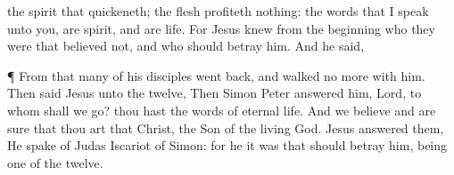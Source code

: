 {{{the spirit
that quickeneth;
the flesh
profiteth
nothing:
the words
that
I
speak
unto you,
{}
are
spirit,
and
{}
are
life.}}
For
Jesus
knew
from the
beginning
who they
were that
believed
not,
and
who
should
betray
him.
And he
said,
{}
\par }{\PP {}¶
From
that
{}
many
of
his
disciples
went
back,
and
walked no
more
with
him.
Then
said
Jesus unto the
twelve,
{}
Then
Simon
Peter
answered
him,
Lord,
to
whom shall we
go? thou
hast the
words
of
eternal
life.
And
we
believe
and are
sure
that
thou
art that
Christ, the
Son of
the
living
God.
Jesus
answered
them,
{}
He
spake of
Judas
Iscariot
{} of
Simon:
for
he it was that
should
betray
him,
being
one
of the
twelve.

}

